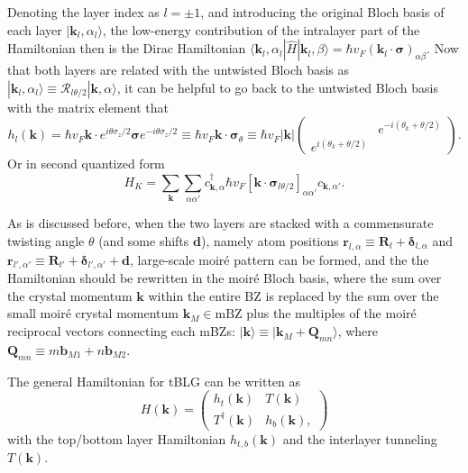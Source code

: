 Denoting the layer index as $l=\pm 1$, and introducing the original Bloch basis of each layer $|\bm k_l,\alpha_l\rangle$, the low-energy contribution of the intralayer part of the Hamiltonian then is the Dirac Hamiltonian $\langle\bm k_l, \alpha_l|\hat H|\bm k_l,\beta\rangle=\hbar v_F(\bm k_l\cdot\bm\sigma)_{\alpha\beta}$. Now that both layers are related with the untwisted Bloch basis as $|\bm k_l,\alpha_l\rangle\equiv \mathcal R_{l\theta/2} |\bm k,\alpha\rangle$, it can be helpful to go back to the untwisted Bloch basis with the matrix element that
\begin{equation*}
    h_l(\bm k)=\hbar v_F\bm k\cdot e^{i\theta \sigma_z/2}\bm\sigma e^{-i\theta\sigma_z/2}\equiv \hbar v_F\bm k\cdot\bm\sigma_\theta\equiv\hbar v_F|\bm k|\begin{pmatrix}
                                 & e^{-i(\theta_k+\theta/2)} \\
        e^{i(\theta_k+\theta/2)} &
    \end{pmatrix}.
\end{equation*}
Or in second quantized form
\begin{equation}\label{eq:tBLG_kinetic_Hamiltonian}
    H_K=\sum_{\bm k}\sum_{\alpha\alpha'}c_{\bm k,\alpha}^\dagger \hbar v_F[\bm k\cdot\bm\sigma_{l\theta/2}]_{\alpha\alpha'}c_{\bm k,\alpha'}.
\end{equation}

As is discussed before, when the two layers are stacked with a commensurate twisting angle $\theta$ (and some shifts $\bm d$), namely atom positions $\bm r_{l,\alpha}\equiv\bm R_l+\bm\delta_{l,\alpha}$ and $\bm r_{l',\alpha'}\equiv\bm R_{l'}+\bm\delta_{l',\alpha'}+\bm d$, large-scale moir\'e pattern can be formed, and the the Hamiltonian should be rewritten in the moir\'e Bloch basis, where the sum over the crystal momentum $\bm k$ within the entire BZ is replaced by the sum over the small moir\'e crystal momentum $\bm k_M\in\text{mBZ}$ plus the multiples of the moir\'e reciprocal vectors connecting each mBZs: $|\bm k\rangle\equiv|\bm k_M+\bm Q_{mn}\rangle$, where $\bm Q_{mn}\equiv m\bm b_{M1}+n\bm b_{M2}$.




The general Hamiltonian for tBLG can be written as
\begin{equation*}
    H(\bm k) = \begin{pmatrix}
        h_t(\bm k)       & T(\bm k)    \\
        T^\dagger(\bm k) & h_b(\bm k),
    \end{pmatrix}
\end{equation*}
with the top/bottom layer Hamiltonian $h_{t,b}(\bm k)$ and the interlayer tunneling $T(\bm k)$.



